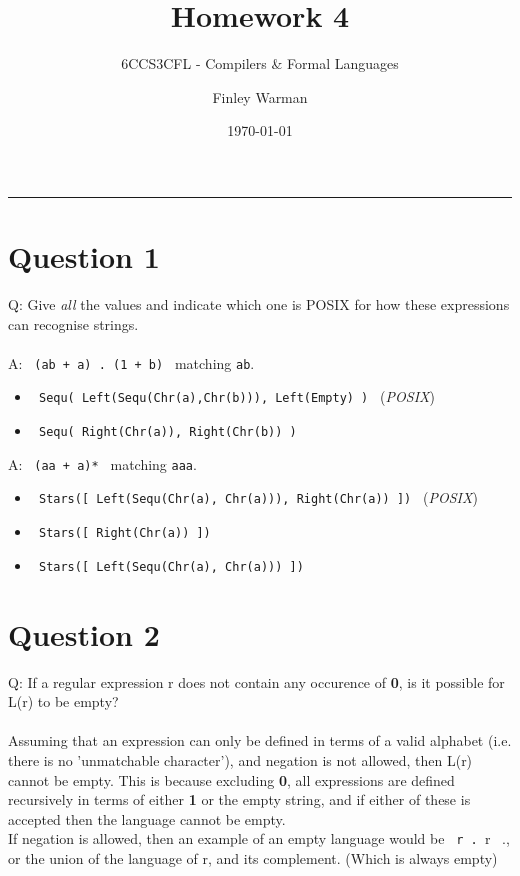 \documentclass[english]{scrartcl}
\begin{document}


\subtitle{6CCS3CFL - Compilers \& Formal Languages}
\title{Homework 4}
\author{Finley Warman}
\date{\today}

\maketitle


\tableofcontents
\par\noindent\rule{\textwidth}{0.4pt}


\newpage


\section*{Question 1}
Q: Give \textit{all} the values and indicate which one is POSIX for how these expressions can recognise strings.
\\
\\
A: \verb~ (ab + a) . (1 + b) ~ matching \verb~ab~.
\begin{itemize}
  \item \verb~ Sequ( Left(Sequ(Chr(a),Chr(b))), Left(Empty) ) ~ (\textit{POSIX})
  \item \verb~ Sequ( Right(Chr(a)), Right(Chr(b)) ) ~
\end{itemize}

A: \verb~ (aa + a)* ~ matching \verb~aaa~.
\begin{itemize}
  \item \verb~ Stars([ Left(Sequ(Chr(a), Chr(a))), Right(Chr(a)) ]) ~ (\textit{POSIX})
  \item \verb~ Stars([ Right(Chr(a)) ]) ~
  \item \verb~ Stars([ Left(Sequ(Chr(a), Chr(a))) ]) ~
\end{itemize}


\section*{Question 2}
Q: If a regular expression r does not contain any occurence of \textbf{0}, is it possible for L(r) to be empty?
\\
\\
Assuming that an expression can only be defined in terms of a valid alphabet (i.e. there is no 'unmatchable character'), and negation is not allowed, then L(r) cannot be empty.
This is because excluding \textbf{0}, all expressions are defined recursively in terms of either \textbf{1} or the empty string, and if either of these is accepted then the language cannot be empty.
\\
If negation is allowed, then an example of an empty language would be \verb~ r . ~r ~., or the union of the language of r, and its complement. (Which is always empty)
\end{document}
